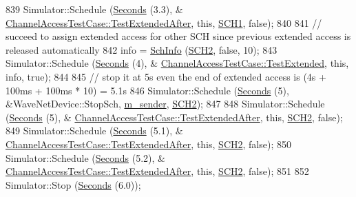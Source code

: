 \begin{DoxyCode}
839     Simulator::Schedule (\hyperlink{group__timecivil_ga33c34b816f8ff6628e33d5c8e9713b9e}{Seconds} (3.3), &
      \hyperlink{classChannelAccessTestCase_a9578cc501b608d9772c3ded4e6619c17}{ChannelAccessTestCase::TestExtendedAfter}, \textcolor{keyword}{this}, 
      \hyperlink{channel-manager_8h_a456a1b730523e5d3b8a29fb227d10028}{SCH1}, \textcolor{keyword}{false});
840 
841     \textcolor{comment}{// succeed to assign extended access for other SCH since previous extended access is released
       automatically}
842     info = \hyperlink{structns3_1_1SchInfo}{SchInfo} (\hyperlink{channel-manager_8h_a07a0bff852fe2b8538a46d6e779546b6}{SCH2}, \textcolor{keyword}{false}, 10);
843     Simulator::Schedule (\hyperlink{group__timecivil_ga33c34b816f8ff6628e33d5c8e9713b9e}{Seconds} (4), &
      \hyperlink{classChannelAccessTestCase_aeacbe5638af4e2b93a53229020abd796}{ChannelAccessTestCase::TestExtended}, \textcolor{keyword}{this}, info, \textcolor{keyword}{true});
844 
845     \textcolor{comment}{// stop it at 5s even the end of extended access is (4s + 100ms + 100ms * 10) = 5.1s}
846     Simulator::Schedule (\hyperlink{group__timecivil_ga33c34b816f8ff6628e33d5c8e9713b9e}{Seconds} (5), &WaveNetDevice::StopSch, \hyperlink{classChannelAccessTestCase_af2ed348403976d1e39d0099313ed3680}{m\_sender}, 
      \hyperlink{channel-manager_8h_a07a0bff852fe2b8538a46d6e779546b6}{SCH2});
847 
848     Simulator::Schedule (\hyperlink{group__timecivil_ga33c34b816f8ff6628e33d5c8e9713b9e}{Seconds} (5), &
      \hyperlink{classChannelAccessTestCase_a9578cc501b608d9772c3ded4e6619c17}{ChannelAccessTestCase::TestExtendedAfter}, \textcolor{keyword}{this}, 
      \hyperlink{channel-manager_8h_a07a0bff852fe2b8538a46d6e779546b6}{SCH2}, \textcolor{keyword}{false});
849     Simulator::Schedule (\hyperlink{group__timecivil_ga33c34b816f8ff6628e33d5c8e9713b9e}{Seconds} (5.1), &
      \hyperlink{classChannelAccessTestCase_a9578cc501b608d9772c3ded4e6619c17}{ChannelAccessTestCase::TestExtendedAfter}, \textcolor{keyword}{this}, 
      \hyperlink{channel-manager_8h_a07a0bff852fe2b8538a46d6e779546b6}{SCH2}, \textcolor{keyword}{false});
850     Simulator::Schedule (\hyperlink{group__timecivil_ga33c34b816f8ff6628e33d5c8e9713b9e}{Seconds} (5.2), &
      \hyperlink{classChannelAccessTestCase_a9578cc501b608d9772c3ded4e6619c17}{ChannelAccessTestCase::TestExtendedAfter}, \textcolor{keyword}{this}, 
      \hyperlink{channel-manager_8h_a07a0bff852fe2b8538a46d6e779546b6}{SCH2}, \textcolor{keyword}{false});
851 
852     Simulator::Stop (\hyperlink{group__timecivil_ga33c34b816f8ff6628e33d5c8e9713b9e}{Seconds} (6.0));

\end{DoxyCode}
